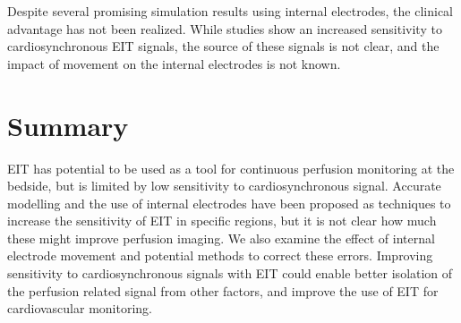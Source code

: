 Despite several promising simulation results using internal electrodes, the clinical advantage
has not been realized. While studies show an increased sensitivity to cardiosynchronous
EIT signals, the source of these signals is not clear, and the impact of movement 
on the internal electrodes is not known. 

\section{Summary}
EIT has potential to be used as a tool for continuous perfusion monitoring at the bedside,
but is limited by low sensitivity to cardiosynchronous signal. 
Accurate modelling and 
the use of internal electrodes have been proposed as techniques to 
increase the sensitivity of EIT in specific regions, 
but it is not clear how much these might improve perfusion imaging. 
We also examine the effect of internal electrode movement and potential
methods to correct these errors. 
Improving sensitivity to cardiosynchronous signals with EIT could enable 
better isolation of the perfusion related signal from other factors, and 
improve the use of EIT for cardiovascular monitoring. 


%










